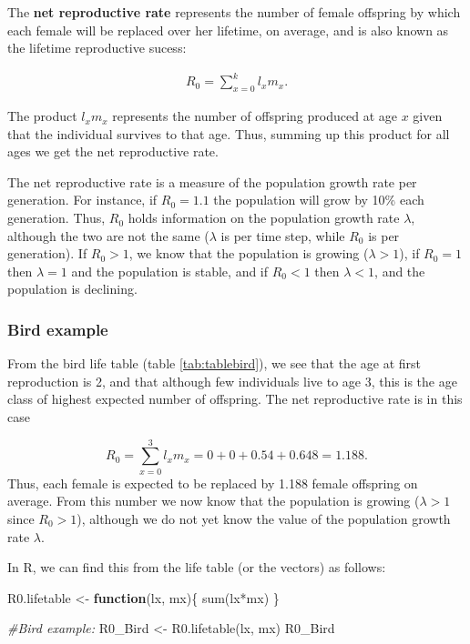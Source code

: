 \documentclass[
]{book}
\newenvironment{Shaded}{\begin{snugshade}}{\end{snugshade}}
\newcommand{\CommentTok}[1]{\textcolor[rgb]{0.56,0.35,0.01}{\textit{#1}}}
\newcommand{\ControlFlowTok}[1]{\textcolor[rgb]{0.13,0.29,0.53}{\textbf{#1}}}
\newcommand{\FunctionTok}[1]{\textcolor[rgb]{0.00,0.00,0.00}{#1}}
\newcommand{\NormalTok}[1]{#1}
\newcommand{\OtherTok}[1]{\textcolor[rgb]{0.56,0.35,0.01}{#1}}
\newcommand{\SpecialCharTok}[1]{\textcolor[rgb]{0.00,0.00,0.00}{#1}}
\begin{document}
The \textbf{net reproductive rate} represents the number of female offspring by which each female will be replaced over her lifetime, on average, and is also known as the lifetime reproductive sucess:

\begin{align}
R_0=\sum_{x=0}^k l_xm_x.
\label{eq:R0}
\end{align}

The product \(l_xm_x\) represents the number of offspring produced at age \(x\) given that the individual survives to that age. Thus, summing up this product for all ages we get the net reproductive rate.

The net reproductive rate is a measure of the population growth rate per generation. For instance, if \(R_0=1.1\) the population will grow by 10\% each generation. Thus, \(R_0\) holds information on the population growth rate \(\lambda\), although the two are not the same (\(\lambda\) is per time step, while \(R_0\) is per generation). If \(R_0>1\), we know that the population is growing (\(\lambda>1\)), if \(R_0=1\) then \(\lambda=1\) and the population is stable, and if \(R_0<1\) then \(\lambda<1\), and the population is declining.

\hypertarget{bird-example}{%
\subsubsection*{Bird example}\label{bird-example}}

From the bird life table (table \ref{tab:tablebird}), we see that the age at first reproduction is 2, and that although few individuals live to age 3, this is the age class of highest expected number of offspring. The net reproductive rate is in this case

\[
R_0=\sum_{x=0}^3 l_xm_x=0+0+0.54+0.648=1.188.
\]
Thus, each female is expected to be replaced by 1.188 female offspring on average. From this number we now know that the population is growing (\(\lambda>1\) since \(R_0>1\)), although we do not yet know the value of the population growth rate \(\lambda\).

In R, we can find this from the life table (or the vectors) as follows:

\begin{Shaded}
\begin{Highlighting}[]
\NormalTok{R0.lifetable }\OtherTok{\textless{}{-}} \ControlFlowTok{function}\NormalTok{(lx, mx)\{}
  \FunctionTok{sum}\NormalTok{(lx}\SpecialCharTok{*}\NormalTok{mx) }
\NormalTok{\}}

\CommentTok{\#Bird example:}
\NormalTok{R0\_Bird }\OtherTok{\textless{}{-}} \FunctionTok{R0.lifetable}\NormalTok{(lx, mx) }
\NormalTok{R0\_Bird}
\end{Highlighting}
\end{Shaded}
\end{document}
